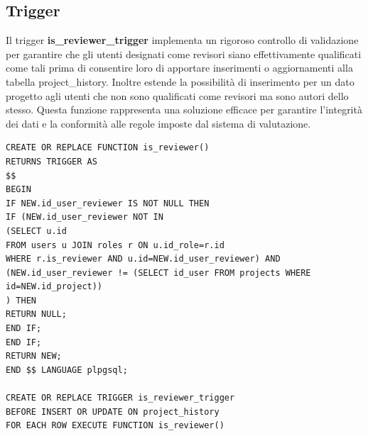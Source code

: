 \documentclass{article}
\begin{document}
\subsection{Trigger}
Il trigger \textbf{is\_reviewer\_trigger} implementa un rigoroso controllo di validazione per garantire che gli utenti designati come revisori siano effettivamente qualificati come tali prima di consentire loro di apportare inserimenti o aggiornamenti alla tabella project\_history. Inoltre estende la possibilità di inserimento per un dato progetto agli utenti che non sono qualificati come revisori ma sono autori dello stesso. 
Questa funzione rappresenta una soluzione efficace per garantire l'integrità dei dati e la conformità alle regole imposte dal sistema di valutazione.
\begin{lstlisting}
CREATE OR REPLACE FUNCTION is_reviewer()
RETURNS TRIGGER AS
$$
BEGIN
IF NEW.id_user_reviewer IS NOT NULL THEN
IF (NEW.id_user_reviewer NOT IN
(SELECT u.id
FROM users u JOIN roles r ON u.id_role=r.id
WHERE r.is_reviewer AND u.id=NEW.id_user_reviewer) AND
(NEW.id_user_reviewer != (SELECT id_user FROM projects WHERE id=NEW.id_project))
) THEN
RETURN NULL;
END IF;
END IF;
RETURN NEW;
END $$ LANGUAGE plpgsql;

CREATE OR REPLACE TRIGGER is_reviewer_trigger
BEFORE INSERT OR UPDATE ON project_history
FOR EACH ROW EXECUTE FUNCTION is_reviewer()
\end{lstlisting}
\end{document}

